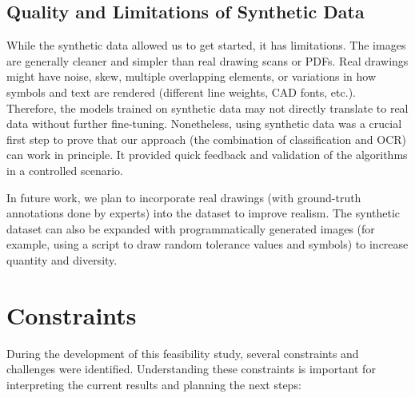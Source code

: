\documentclass[11pt,a4paper]{article}
\begin{document}
\subsection*{Quality and Limitations of Synthetic Data}
While the synthetic data allowed us to get started, it has limitations. The images are generally cleaner and simpler than real drawing scans or PDFs. Real drawings might have noise, skew, multiple overlapping elements, or variations in how symbols and text are rendered (different line weights, CAD fonts, etc.). Therefore, the models trained on synthetic data may not directly translate to real data without further fine-tuning. Nonetheless, using synthetic data was a crucial first step to prove that our approach (the combination of classification and OCR) can work in principle. It provided quick feedback and validation of the algorithms in a controlled scenario.

In future work, we plan to incorporate real drawings (with ground-truth annotations done by experts) into the dataset to improve realism. The synthetic dataset can also be expanded with programmatically generated images (for example, using a script to draw random tolerance values and symbols) to increase quantity and diversity.

\section{Constraints}
During the development of this feasibility study, several constraints and challenges were identified. Understanding these constraints is important for interpreting the current results and planning the next steps:
\end{document}
